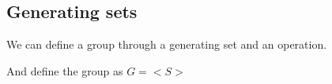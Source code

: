 
\subsection{Generating sets}

We can define a group through a generating set and an operation.

And define the group as \(G=< S >\)

